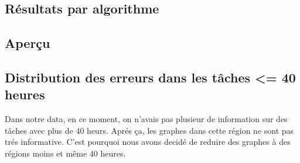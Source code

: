 \newpage{}

\begin{landscape}

\section{Résultats par algorithme}

\subsection{Aperçu}



\end{landscape}

\subsection{Distribution des erreurs dans les tâches <= 40 heures}

Dans notre data, en ce moment, on n'avais pas plusieur de information sur des tâches avec plus de 40 heurs. 
Aprés ça, les graphes dans cette région ne sont pas trés informative. 
C'est pourquoi nous avons decidé de reduire des graphes à des régions moins et
même 40 heures.

\newpage

